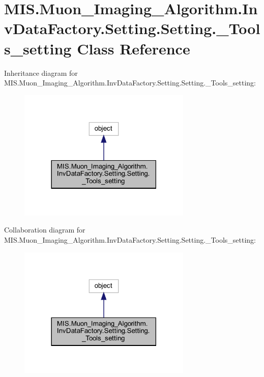 \hypertarget{classMIS_1_1Muon__Imaging__Algorithm_1_1InvDataFactory_1_1Setting_1_1Setting_1_1__Tools__setting}{}\section{M\+I\+S.\+Muon\+\_\+\+Imaging\+\_\+\+Algorithm.\+Inv\+Data\+Factory.\+Setting.\+Setting.\+\_\+\+Tools\+\_\+setting Class Reference}
\label{classMIS_1_1Muon__Imaging__Algorithm_1_1InvDataFactory_1_1Setting_1_1Setting_1_1__Tools__setting}


Inheritance diagram for M\+I\+S.\+Muon\+\_\+\+Imaging\+\_\+\+Algorithm.\+Inv\+Data\+Factory.\+Setting.\+Setting.\+\_\+\+Tools\+\_\+setting\+:
\nopagebreak
\begin{figure}[H]
\begin{center}
\leavevmode
\includegraphics[width=234pt]{classMIS_1_1Muon__Imaging__Algorithm_1_1InvDataFactory_1_1Setting_1_1Setting_1_1__Tools__setting__inherit__graph}
\end{center}
\end{figure}


Collaboration diagram for M\+I\+S.\+Muon\+\_\+\+Imaging\+\_\+\+Algorithm.\+Inv\+Data\+Factory.\+Setting.\+Setting.\+\_\+\+Tools\+\_\+setting\+:
\nopagebreak
\begin{figure}[H]
\begin{center}
\leavevmode
\includegraphics[width=234pt]{classMIS_1_1Muon__Imaging__Algorithm_1_1InvDataFactory_1_1Setting_1_1Setting_1_1__Tools__setting__coll__graph}
\end{center}
\end{figure}
